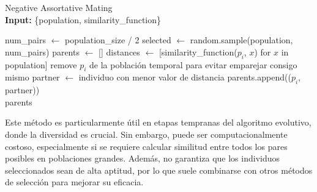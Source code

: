 \begin{algorithm}[H]
	\caption{Negative Assortative Mating \\ \textbf{Input:} \{population, similarity\_function\}}
	\begin{algorithmic}[1]
		\State num\_pairs $\gets$ population\_size / 2
		\State selected $\gets$ random.sample(population, num\_pairs)
		\State parents $\gets$ []
		\State distances $\gets$ [similarity\_function($p_i$, $x$) for $x$ in population]
		\State remove $p_i$ de la población temporal para evitar emparejar consigo mismo
		\State partner $\gets$ individuo con menor valor de distancia
		\State parents.append(($p_i$, partner))
		\EndFor \\
		\Return parents
	\end{algorithmic}
	\label{alg:negative_assortative}
\end{algorithm}

Este método es particularmente útil en etapas tempranas del algoritmo evolutivo, donde la diversidad es crucial. Sin embargo, puede ser computacionalmente costoso, especialmente si se requiere calcular similitud entre todos los pares posibles en poblaciones grandes. Además, no garantiza que los individuos seleccionados sean de alta aptitud, por lo que suele combinarse con otros métodos de selección para mejorar su eficacia.
